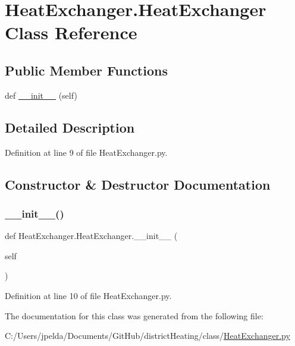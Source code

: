 \hypertarget{class_heat_exchanger_1_1_heat_exchanger}{}\section{Heat\+Exchanger.\+Heat\+Exchanger Class Reference}
\label{class_heat_exchanger_1_1_heat_exchanger}
\subsection*{Public Member Functions}
\begin{DoxyCompactItemize}
\item 
def \hyperlink{class_heat_exchanger_1_1_heat_exchanger_a1c572fc1cc219f709aa83cefccfea350}{\+\_\+\+\_\+init\+\_\+\+\_\+} (self)
\end{DoxyCompactItemize}


\subsection{Detailed Description}


Definition at line 9 of file Heat\+Exchanger.\+py.



\subsection{Constructor \& Destructor Documentation}
\mbox{\label{class_heat_exchanger_1_1_heat_exchanger_a1c572fc1cc219f709aa83cefccfea350}} 
\subsubsection{\texorpdfstring{\+\_\+\+\_\+init\+\_\+\+\_\+()}{\_\_init\_\_()}}
{\footnotesize\ttfamily def Heat\+Exchanger.\+Heat\+Exchanger.\+\_\+\+\_\+init\+\_\+\+\_\+ (\begin{DoxyParamCaption}\item[{}]{self }\end{DoxyParamCaption})}



Definition at line 10 of file Heat\+Exchanger.\+py.



The documentation for this class was generated from the following file\+:\begin{DoxyCompactItemize}
\item 
C\+:/\+Users/jpelda/\+Documents/\+Git\+Hub/district\+Heating/class/\hyperlink{_heat_exchanger_8py}{Heat\+Exchanger.\+py}\end{DoxyCompactItemize}
